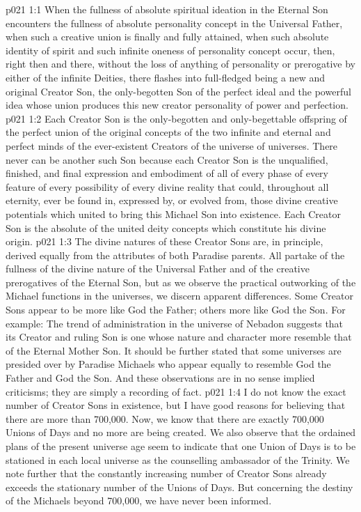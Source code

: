 \vs p021 1:1 When the fullness of absolute spiritual ideation in the Eternal Son encounters the fullness of absolute personality concept in the Universal Father, when such a creative union is finally and fully attained, when such absolute identity of spirit and such infinite oneness of personality concept occur, then, right then and there, without the loss of anything of personality or prerogative by either of the infinite Deities, there flashes into full\hyp{}fledged being a new and original Creator Son, the only\hyp{}begotten Son of the perfect ideal and the powerful idea whose union produces this new creator personality of power and perfection.
\vs p021 1:2 Each Creator Son is the only\hyp{}begotten and only\hyp{}begettable offspring of the perfect union of the original concepts of the two infinite and eternal and perfect minds of the ever\hyp{}existent Creators of the universe of universes. There never can be another such Son because each Creator Son is the unqualified, finished, and final expression and embodiment of all of every phase of every feature of every possibility of every divine reality that could, throughout all eternity, ever be found in, expressed by, or evolved from, those divine creative potentials which united to bring this Michael Son into existence. Each Creator Son is the absolute of the united deity concepts which constitute his divine origin.
\vs p021 1:3 The divine natures of these Creator Sons are, in principle, derived equally from the attributes of both Paradise parents. All partake of the fullness of the divine nature of the Universal Father and of the creative prerogatives of the Eternal Son, but as we observe the practical outworking of the Michael functions in the universes, we discern apparent differences. Some Creator Sons appear to be more like God the Father; others more like God the Son. For example: The trend of administration in the universe of Nebadon suggests that its Creator and ruling Son is one whose nature and character more resemble that of the Eternal Mother Son. It should be further stated that some universes are presided over by Paradise Michaels who appear equally to resemble God the Father and God the Son. And these observations are in no sense implied criticisms; they are simply a recording of fact.
\vs p021 1:4 I do not know the exact number of Creator Sons in existence, but I have good reasons for believing that there are more than 700,000. Now, we know that there are exactly 700,000 Unions of Days and no more are being created. We also observe that the ordained plans of the present universe age seem to indicate that one Union of Days is to be stationed in each local universe as the counselling ambassador of the Trinity. We note further that the constantly increasing number of Creator Sons already exceeds the stationary number of the Unions of Days. But concerning the destiny of the Michaels beyond 700,000, we have never been informed.
